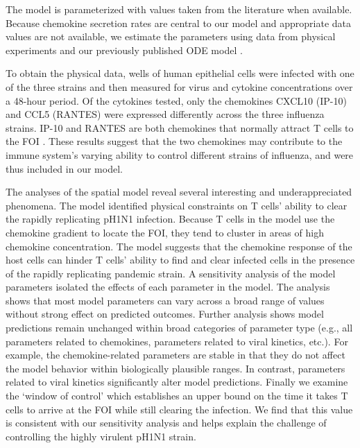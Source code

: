 \documentclass[preprint,10pt,numbers]{elsarticle}
\newcommand{\removed}[1]{}
\newcommand{\new}[1]{#1}
\begin{document}
The model is parameterized with values taken from the literature when available.  Because chemokine secretion rates are central to our model and appropriate data values are not available, we estimate the parameters using data from physical experiments and \removed{an earlier}\new{our previously published} ODE model \citep{Mitchell2011}.   

To obtain the physical data, wells of human epithelial cells were infected with one of the three strains and then measured for virus and cytokine concentrations over a 48-hour period.   Of the cytokines tested, only the chemokines CXCL10 (IP-10) and CCL5 (RANTES) were expressed differently across the three influenza strains.   IP-10 and RANTES are both chemokines that normally attract T cells to the FOI \citep{Hoji2005, Groom2011a}.  These results suggest that the two chemokines may contribute to the immune system's varying ability to control different strains of influenza, and were thus included in our model.

The \new{analyses of the} spatial model \removed{and the supporting experiments} reveal several interesting and underappreciated phenomena.  The model identified physical constraints on T cells' ability to clear the rapidly replicating pH1N1 infection. Because T cells in the model use the chemokine gradient to locate the FOI, they tend to cluster in areas of high chemokine concentration. The model suggests that the chemokine response of the host cells can hinder T cells’ ability to find and clear infected cells in the presence of the rapidly replicating pandemic strain. A sensitivity analysis of the model parameters isolated the effects of each parameter in the model.  The analysis shows that most model parameters can vary across a broad range of values without strong effect on predicted outcomes.  Further analysis shows model predictions remain unchanged within broad categories of parameter type (e.g., all parameters related to chemokines, parameters related to viral kinetics, etc.).  For example, the chemokine-related parameters are stable in that they do not affect the model behavior within biologically plausible ranges. In contrast, parameters related to viral kinetics significantly alter model predictions.  Finally we examine the `window of control' which establishes an upper bound on the time it takes T cells to arrive at the FOI while still clearing the infection.  We find that this value is consistent with our sensitivity analysis and helps explain the challenge of controlling the highly virulent pH1N1 strain.
\end{document}
